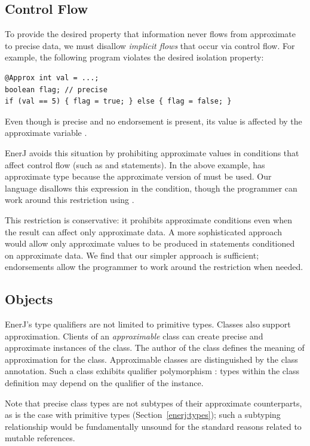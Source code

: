 \subsection{Control Flow}
To provide the desired property that information never flows from
approximate to precise data, we must disallow \emph{implicit flows} that occur
via control flow. For example, the following program
violates the desired isolation property:
\begin{lstlisting}
@Approx int val = ...;
boolean flag; // precise
if (val == 5) { flag = true; } else { flag = false; }
\end{lstlisting}
Even though  is precise and no endorsement is
present, its value is affected by the approximate variable .

EnerJ avoids this situation by prohibiting approximate values in
conditions that affect control flow (such as  and
 statements).
In the
above example,  has approximate type
because the approximate version of \ilcode{==} must be used. Our
language disallows this expression in the condition, though the
programmer can work around this restriction using
.

This restriction is conservative: it prohibits approximate conditions even
when the result can affect only approximate data. A more sophisticated
approach would allow only approximate values to be produced in statements
conditioned on approximate data. We find that our simpler approach
is sufficient; endorsements allow the programmer to work around the
restriction when needed.

\subsection{Objects}
\label{enerj:objects}
EnerJ's type qualifiers are not limited to primitive types.
Classes also support approximation.
Clients of an \emph{approximable} class can create
precise and approximate instances of the class. The author of the
class defines the meaning of approximation for the class.
Approximable classes are distinguished by the 
class annotation. Such a class exhibits qualifier polymorphism
\cite{qualifiers}: types within the class definition
may depend on the qualifier of the instance.

Note that precise class types are not subtypes of their approximate
counterparts, as is the case with primitive types (Section~\ref{enerj:types});
such a subtyping relationship would be fundamentally unsound for the
standard reasons related to mutable references.

